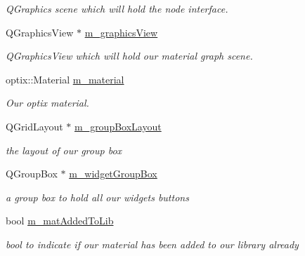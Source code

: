 \begin{DoxyCompactItemize}
\begin{DoxyCompactList}\small\item\em Q\-Graphics scene which will hold the node interface. \end{DoxyCompactList}\item 
\hypertarget{class_abstract_material_widget_a9e3d797b92f1518223ff4f48d1c35918}{Q\-Graphics\-View $\ast$ \hyperlink{class_abstract_material_widget_a9e3d797b92f1518223ff4f48d1c35918}{m\-\_\-graphics\-View}}\label{class_abstract_material_widget_a9e3d797b92f1518223ff4f48d1c35918}

\begin{DoxyCompactList}\small\item\em Q\-Graphics\-View which will hold our material graph scene. \end{DoxyCompactList}\item 
\hypertarget{class_abstract_material_widget_afd84a89a0bfff011f67af8b844a156c9}{optix\-::\-Material \hyperlink{class_abstract_material_widget_afd84a89a0bfff011f67af8b844a156c9}{m\-\_\-material}}\label{class_abstract_material_widget_afd84a89a0bfff011f67af8b844a156c9}

\begin{DoxyCompactList}\small\item\em Our optix material. \end{DoxyCompactList}\item 
\hypertarget{class_abstract_material_widget_aabf9f661c778f9f2926777f5177ed176}{Q\-Grid\-Layout $\ast$ \hyperlink{class_abstract_material_widget_aabf9f661c778f9f2926777f5177ed176}{m\-\_\-group\-Box\-Layout}}\label{class_abstract_material_widget_aabf9f661c778f9f2926777f5177ed176}

\begin{DoxyCompactList}\small\item\em the layout of our group box \end{DoxyCompactList}\item 
\hypertarget{class_abstract_material_widget_a2267d86e075a49f0b127a0dc53f4a924}{Q\-Group\-Box $\ast$ \hyperlink{class_abstract_material_widget_a2267d86e075a49f0b127a0dc53f4a924}{m\-\_\-widget\-Group\-Box}}\label{class_abstract_material_widget_a2267d86e075a49f0b127a0dc53f4a924}

\begin{DoxyCompactList}\small\item\em a group box to hold all our widgets buttons \end{DoxyCompactList}\item 
\hypertarget{class_abstract_material_widget_abf17d1069b4ed91bc0fccbf724404ef9}{bool \hyperlink{class_abstract_material_widget_abf17d1069b4ed91bc0fccbf724404ef9}{m\-\_\-mat\-Added\-To\-Lib}}\label{class_abstract_material_widget_abf17d1069b4ed91bc0fccbf724404ef9}

\begin{DoxyCompactList}\small\item\em bool to indicate if our material has been added to our library already \end{DoxyCompactList}\end{DoxyCompactItemize}
